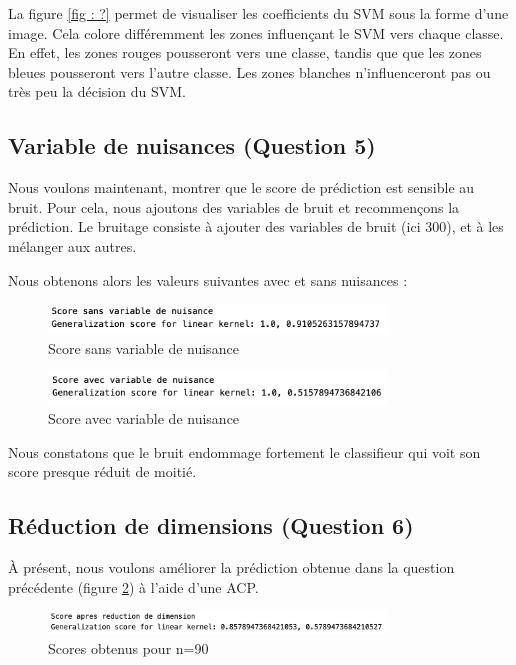 \documentclass[a4paper,12pt]{article}
\begin{document}
La figure \ref{fig : ?} permet de visualiser les coefficients du SVM sous la forme d'une image.
Cela colore différemment les zones influençant le SVM vers chaque classe. 
En effet, les zones rouges pousseront vers une classe, tandis que que les zones bleues pousseront vers l'autre classe.
Les zones blanches n'influenceront pas ou très peu la décision du SVM.

\subsection{Variable de nuisances (Question 5)}

Nous voulons maintenant, montrer que le score de prédiction est sensible au bruit. Pour cela, nous ajoutons des variables de bruit et
recommençons la prédiction. Le bruitage consiste à ajouter des variables de bruit (ici 300), et à les mélanger aux autres. 

Nous obtenons alors les valeurs suivantes avec et sans nuisances :

\begin{figure}[H]
    \centering
    \includegraphics[width=0.8\textwidth]{Images/sans_variable.png}
    \caption{Score sans variable de nuisance}\label{fig: sans}
\end{figure}

\begin{figure}[H]
    \centering
    \includegraphics[width=0.8\textwidth]{Images/avec_variable.png}
    \caption{Score avec variable de nuisance}\label{fig: avec}
\end{figure}

Nous constatons que le bruit endommage fortement le classifieur qui voit son score presque réduit de moitié.

\subsection{Réduction de dimensions (Question 6)}

À présent, nous voulons améliorer la prédiction obtenue dans la question précédente (figure \ref{fig: avec}) à l'aide d'une ACP.

\begin{figure}[H]
    \centering
    \includegraphics[width=0.8\textwidth]{Images/apres_reduction.png}
    \caption{Scores obtenus pour n=90}\label{fig : dim}
\end{figure}
\end{document}
